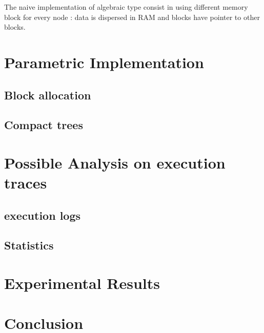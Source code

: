 \documentclass[12pt]{article}
\begin{document}
The naive implementation of algebraic type consist in using different memory
block for every node : data is dispersed in RAM and blocks have pointer to
other blocks.



\section{Parametric Implementation}

\subsection{Block allocation}

\subsection{Compact trees}


\section{Possible Analysis on execution traces}

\subsection{execution logs}

\subsection{Statistics}

\section{Experimental Results}



\section{Conclusion}
\end{document}

